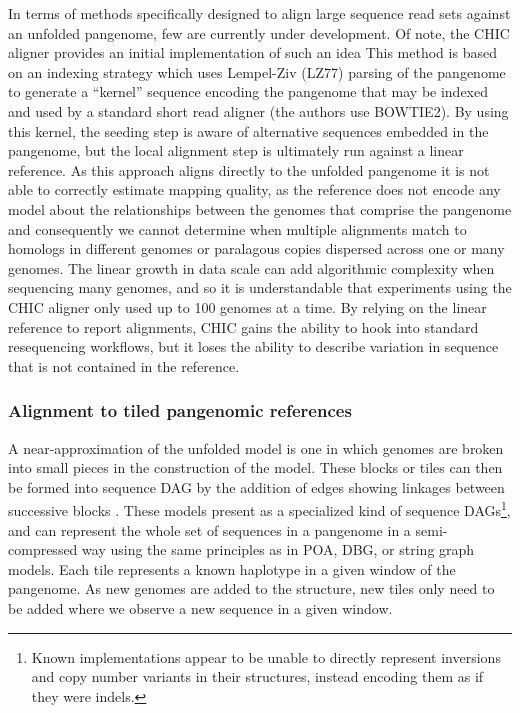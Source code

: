 In terms of methods specifically designed to align large sequence read sets against an unfolded pangenome, few are currently under development.
Of note, the CHIC aligner provides an initial implementation of such an idea \cite{valenzuela2017chic}
This method is based on an indexing strategy which uses Lempel-Ziv (LZ77) \cite{ziv1977universal} parsing of the pangenome to generate a ``kernel'' sequence encoding the pangenome that may be indexed and used by a standard short read aligner (the authors use BOWTIE2).
By using this kernel, the seeding step is aware of alternative sequences embedded in the pangenome, but the local alignment step is ultimately run against a linear reference.
As this approach aligns directly to the unfolded pangenome it is not able to correctly estimate mapping quality, as the reference does not encode any model about the relationships between the genomes that comprise the pangenome and consequently we cannot determine when multiple alignments match to homologs in different genomes or paralagous copies dispersed across one or many genomes.
The linear growth in data scale can add algorithmic complexity when sequencing many genomes, and so it is understandable that experiments using the CHIC aligner only used up to 100 genomes at a time.
By relying on the linear reference to report alignments, CHIC gains the ability to hook into standard resequencing workflows, but it loses the ability to describe variation in sequence that is not contained in the reference.



\subsubsection{Alignment to tiled pangenomic references}

A near-approximation of the unfolded model is one in which genomes are broken into small pieces in the construction of the model.
These blocks or tiles can then be formed into sequence DAG by the addition of edges showing linkages between successive blocks \cite{guthrie2015tiling}.
These models present as a specialized kind of sequence DAGs\footnote{Known implementations appear to be unable to directly represent inversions and copy number variants in their structures, instead encoding them as if they were indels.}, and can represent the whole set of sequences in a pangenome in a semi-compressed way using the same principles as in POA, DBG, or string graph models.
Each tile represents a known haplotype in a given window of the pangenome.
As new genomes are added to the structure, new tiles only need to be added where we observe a new sequence in a given window.

